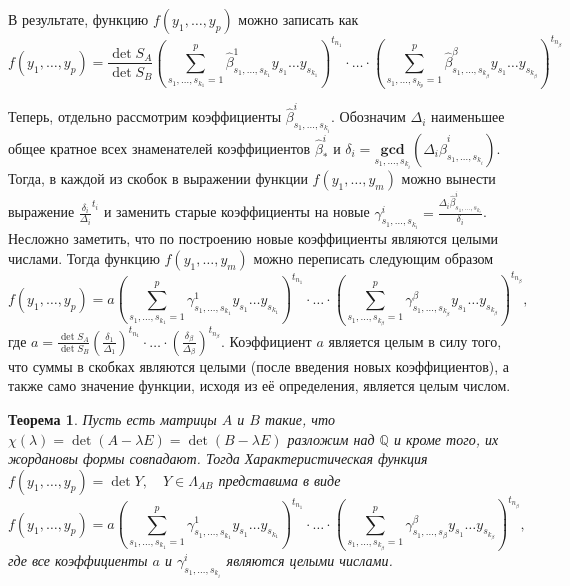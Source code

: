\documentclass[11pt, a4paper]{article}
\newtheorem{theorem}{Теорема}
\begin{document}
В результате, функцию $f(y_1,\dots, y_p)$ можно записать как
\[
    f(y_1,\dots, y_p) = \frac{\det S_A}{\det S_B}\left(\sum_{s_1,\dots,s_{k_1} = 1}^{p}{\hat{\beta}_{s_1,\dots,s_{k_1}}^{1} y_{s_1}\dots y_{s_{k_1}}}\right)^{t_{n_1}}\cdot\ldots\cdot
    \left(\sum_{s_1,\dots,s_{k_p} = 1}^{p}{\hat{\beta}_{s_1,\dots,s_{k_\beta}}^{\beta} y_{s_1}\dots y_{s_{k_\beta}}}\right)^{t_{n_\beta}}
\] 


Теперь, отдельно рассмотрим коэффициенты $\hat{\beta}_{s_1,\dots, s_{k_i}}^{i}$.
Обозначим $\Delta_{i}$ наименьшее общее кратное всех знаменателей коэффициентов $\hat{\beta}_{\ast}^i$ и $\delta_{i} = \underset{s_1,\dots,s_{k_i}}{\mathbf{gcd}}(\Delta_{i}\hat{\beta}_{s_1,\dots, s_{k_i}}^{i})$.
Тогда, в каждой из скобок в выражении функции $f(y_1,\dots, y_m)$ можно вынести выражение $\frac{\delta_{i}}{\Delta_{i}}^{t_i}$ и заменить старые коэффициенты на новые $\gamma_{s_1,\dots,s_{k_i}}^{i} = \frac{\Delta_{i}\hat{\beta}_{s_1,\dots, s_{k_i}}^{i}}{\delta_{i}}$.
Несложно заметить, что по построению новые коэффициенты являются целыми числами. Тогда функцию $f(y_1,\dots,y_m)$ можно переписать
следующим образом
\[
    f(y_1,\dots,y_p) = a\left(\sum_{s_1,\dots,s_{k_1} = 1}^{p}{\gamma_{s_1,\dots,s_{k_1}}^{1} y_{s_1}\dots y_{s_{k_1}}}\right)^{t_{n_1}}\cdot\ldots\cdot
    \left(\sum_{s_1,\dots,s_{k_\beta} = 1}^{p}{\gamma_{s_1,\dots,s_{k_\beta}}^{\beta} y_{s_1}\dots y_{s_{k_\beta}}}\right)^{t_{n_\beta}},
\]
где $a = \frac{\det S_A}{\det S_B}\left(\frac{\delta_{1}}{\Delta_{1}}\right)^{t_{n_1}}\cdot\ldots\cdot\left(\frac{\delta_{\beta}}{\Delta_{\beta}}\right)^{t_{n_\beta}}$. Коэффициент $a$ является целым в силу того, что суммы в скобках
являются целыми (после введения новых коэффициентов), а также само значение функции, исходя из её определения, является целым числом.

\begin{theorem} \label{theorem:1}
    Пусть есть матрицы $A$ и $B$ такие, что $\chi(\lambda) = \det(A - \lambda E) = \det (B - \lambda E)$ разложим над $\mathbb{Q}$ и кроме того, их жордановы формы совпадают.
    Тогда Характеристическая функция $f(y_1,\dots,y_p)=\det Y, \quad Y \in \Lambda_{AB}$ представима в виде
    \[
       f(y_1,\dots,y_p) = a\left(\sum_{s_1,\dots,s_{k_1} = 1}^{p}{\gamma_{s_1,\dots,s_{k_1}}^{1} y_{s_1}\dots y_{s_{k_1}}}\right)^{t_{n_1}}\cdot\ldots\cdot
       \left(\sum_{s_1,\dots,s_{k_\beta} = 1}^{p}{\gamma_{s_1,\dots,s_{\beta}}^{\beta} y_{s_1}\dots y_{s_{k_\beta}}}\right)^{t_{n_\beta}}, 
    \]
    где все коэффициенты $a$ и $\gamma_{s_1,\dots,s_{k_i}}^{i}$ являются целыми числами.
\end{theorem}
\end{document}
